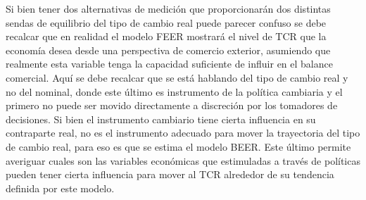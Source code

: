 \documentclass[12pt,letterpaper]{article}
\begin{document}

Si bien tener dos alternativas de medición que proporcionarán dos distintas sendas de equilibrio del tipo de cambio real puede parecer confuso se debe recalcar que en realidad el modelo FEER mostrará el nivel de TCR que la economía desea desde una perspectiva de comercio exterior, asumiendo que realmente esta variable tenga la capacidad suficiente de influir en el balance comercial. Aquí se debe recalcar que se está hablando del tipo de cambio real y no del nominal, donde este último es instrumento de la política cambiaria y el primero no puede ser movido directamente a discreción por los tomadores de decisiones. Si bien el instrumento cambiario tiene cierta influencia en su contraparte real, no es el instrumento adecuado para mover la trayectoria del tipo de cambio real, para eso es que se estima el modelo BEER. Este último permite averiguar cuales son las variables económicas que estimuladas a través de políticas pueden tener cierta influencia para mover al TCR alrededor de su tendencia definida por este modelo.
\end{document}
